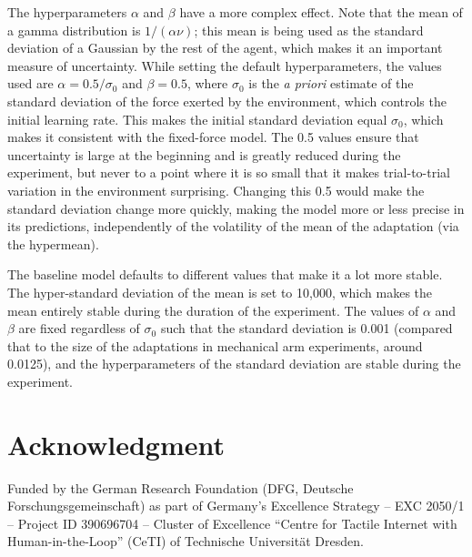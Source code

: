 \documentclass[a4paper,doc,floatsintext,natbib]{apa6}%
\begin{document}
The hyperparameters $\alpha$ and $\beta$ have a more complex effect. Note that
the mean of a gamma distribution is $1 / (\alpha \nu)$; this mean is being used
as the standard deviation of a Gaussian by the rest of the agent, which makes it
an important measure of uncertainty. While setting the default hyperparameters,
the values used are $\alpha = 0.5 / \sigma_0$ and $\beta = 0.5$, where
$\sigma_0$ is the \textit{a priori} estimate of the standard deviation of the
force exerted by the environment, which controls the initial learning rate. This
makes the initial standard deviation equal $\sigma_0$, which makes it consistent
with the fixed-force model. The 0.5 values ensure that uncertainty is large at
the beginning and is greatly reduced during the experiment, but never to a point
where it is so small that it makes trial-to-trial variation in the environment
surprising. Changing this 0.5 would make the standard deviation change more
quickly, making the model more or less precise in its predictions, independently
of the volatility of the mean of the adaptation (via the hypermean).

The baseline model defaults to different values that make it a lot more
stable. The hyper-standard deviation of the mean is set to 10,000, which makes
the mean entirely stable during the duration of the experiment. The values of
$\alpha$ and $\beta$ are fixed regardless of $\sigma_0$ such that the standard
deviation is 0.001 (compared that to the size of the adaptations in mechanical
arm experiments, around 0.0125), and the hyperparameters of the standard
deviation are stable during the experiment.


\section{Acknowledgment}
Funded by the German Research Foundation (DFG, Deutsche Forschungsgemeinschaft) as part of Germany’s Excellence Strategy – EXC 2050/1 – Project ID 390696704 – Cluster of Excellence “Centre for Tactile Internet with Human-in-the-Loop” (CeTI) of Technische Universität Dresden.


\end{document}
